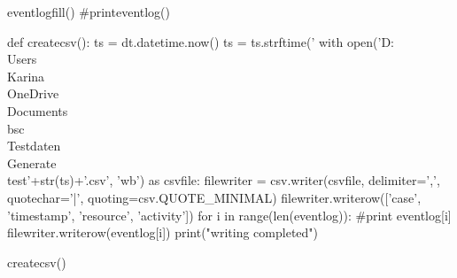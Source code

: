 eventlogfill()
#printeventlog()

def createcsv():
    ts = dt.datetime.now()
    ts = ts.strftime('%
    with open('D:\\Users\\Karina\\OneDrive\\Documents\\bsc\\Testdaten\\Generate\\test'+str(ts)+'.csv', 'wb') as csvfile:
            filewriter = csv.writer(csvfile, delimiter=',', quotechar='|', quoting=csv.QUOTE_MINIMAL)
            filewriter.writerow(['case', 'timestamp', 'resource', 'activity'])
            for i in range(len(eventlog)):
                #print eventlog[i]
                filewriter.writerow(eventlog[i])
    print("writing completed")

createcsv()